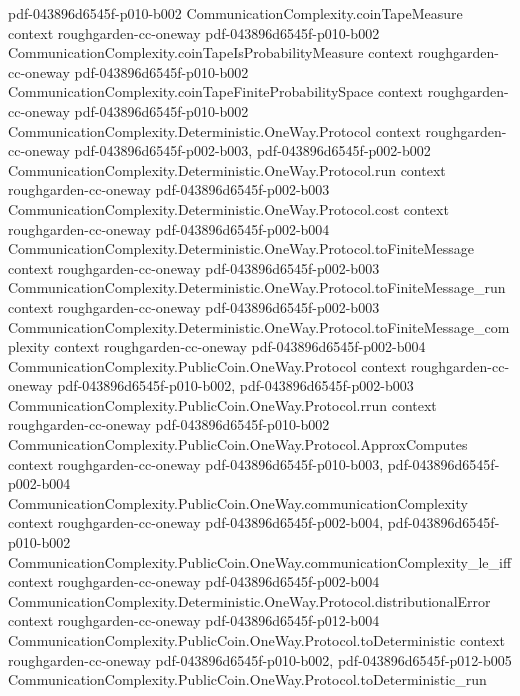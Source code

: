 \begin{theorem}
  {pdf-043896d6545f-p010-b002}
\proofstep
  {CommunicationComplexity.coinTapeMeasure}
  {context}
  {roughgarden-cc-oneway}
  {pdf-043896d6545f-p010-b002}
\proofstep
  {CommunicationComplexity.coinTapeIsProbabilityMeasure}
  {context}
  {roughgarden-cc-oneway}
  {pdf-043896d6545f-p010-b002}
\proofstep
  {CommunicationComplexity.coinTapeFiniteProbabilitySpace}
  {context}
  {roughgarden-cc-oneway}
  {pdf-043896d6545f-p010-b002}
\proofstep
  {CommunicationComplexity.Deterministic.OneWay.Protocol}
  {context}
  {roughgarden-cc-oneway}
  {pdf-043896d6545f-p002-b003,
    pdf-043896d6545f-p002-b002}
\proofstep
  {CommunicationComplexity.Deterministic.OneWay.Protocol.run}
  {context}
  {roughgarden-cc-oneway}
  {pdf-043896d6545f-p002-b003}
\proofstep
  {CommunicationComplexity.Deterministic.OneWay.Protocol.cost}
  {context}
  {roughgarden-cc-oneway}
  {pdf-043896d6545f-p002-b004}
\proofstep
  {CommunicationComplexity.Deterministic.OneWay.Protocol.toFiniteMessage}
  {context}
  {roughgarden-cc-oneway}
  {pdf-043896d6545f-p002-b003}
\proofstep
  {CommunicationComplexity.Deterministic.OneWay.Protocol.toFiniteMessage_run}
  {context}
  {roughgarden-cc-oneway}
  {pdf-043896d6545f-p002-b003}
\proofstep
  {CommunicationComplexity.Deterministic.OneWay.Protocol.toFiniteMessage_complexity}
  {context}
  {roughgarden-cc-oneway}
  {pdf-043896d6545f-p002-b004}
\proofstep
  {CommunicationComplexity.PublicCoin.OneWay.Protocol}
  {context}
  {roughgarden-cc-oneway}
  {pdf-043896d6545f-p010-b002,
    pdf-043896d6545f-p002-b003}
\proofstep
  {CommunicationComplexity.PublicCoin.OneWay.Protocol.rrun}
  {context}
  {roughgarden-cc-oneway}
  {pdf-043896d6545f-p010-b002}
\proofstep
  {CommunicationComplexity.PublicCoin.OneWay.Protocol.ApproxComputes}
  {context}
  {roughgarden-cc-oneway}
  {pdf-043896d6545f-p010-b003,
    pdf-043896d6545f-p002-b004}
\proofstep
  {CommunicationComplexity.PublicCoin.OneWay.communicationComplexity}
  {context}
  {roughgarden-cc-oneway}
  {pdf-043896d6545f-p002-b004,
    pdf-043896d6545f-p010-b002}
\proofstep
  {CommunicationComplexity.PublicCoin.OneWay.communicationComplexity_le_iff}
  {context}
  {roughgarden-cc-oneway}
  {pdf-043896d6545f-p002-b004}
\proofstep
  {CommunicationComplexity.Deterministic.OneWay.Protocol.distributionalError}
  {context}
  {roughgarden-cc-oneway}
  {pdf-043896d6545f-p012-b004}
\proofstep
  {CommunicationComplexity.PublicCoin.OneWay.Protocol.toDeterministic}
  {context}
  {roughgarden-cc-oneway}
  {pdf-043896d6545f-p010-b002,
    pdf-043896d6545f-p012-b005}
\proofstep
  {CommunicationComplexity.PublicCoin.OneWay.Protocol.toDeterministic_run}

\end{theorem}
